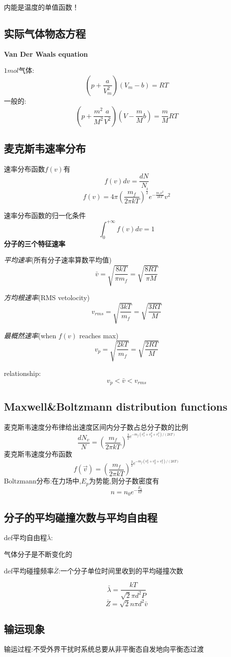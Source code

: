 \documentclass[10pt,a4paper]{article}
\begin{document}
内能是温度的单值函数！
\subsection{实际气体物态方程}
\textbf{Van Der Waals equation}

$1mol$气体:
\[(p+\frac{a}{V_m^2})(V_m-b)=RT\]
一般的:
\[(p+\frac{m^2}{M^2}\frac{a}{V^2})(V-\frac{m}{M}b)=\frac{m}{M}RT\]
\subsection{麦克斯韦速率分布}
速率分布函数$f(v)$有
\[\boxed{f(v)dv=\frac{dN}{N}}\]
\[f(v)=4\pi\left(\frac{m_f}{2\pi kT}\right)^{\frac{3}{2}}e^{-\frac{m_fv^2}{2kT}}v^2\]

速率分布函数的归一化条件
\[\int_0^{+\infty}f(v)dv=1\]
\textbf{分子的三个特征速率}

\textit{平均速率}(所有分子速率算数平均值)
\[\bar{v}=\sqrt{\frac{8kT}{\pi m_f}}=\sqrt{\frac{8RT}{\pi M}}\]

\textit{方均根速率}(RMS vetolocity)
\[v_{rms}=\sqrt{\frac{3kT}{m_f}}=\sqrt{\frac{3RT}{M}}\]

\textit{最概然速率}(when $f(v)$ reaches max)
\[v_{p}=\sqrt{\frac{2kT}{m_f}}=\sqrt{\frac{2RT}{M}}\]

relationship:
\[v_p<\bar{v}<v_{rms}\]
\subsection{Maxwell\&Boltzmann distribution functions}
麦克斯韦速度分布律给出速度区间内分子数占总分子数的比例
\[\frac{dN_v}{N}=\left(\frac{m_f}{2\pi kT}\right)^{\frac{3}{2}e^{-m_f(v_x^2+v_y^2+v_z^2)/(2kT)}} \]
麦克斯韦速度分布函数
\[f(\vec{v})=\left(\frac{m_f}{2\pi kT}\right)^{\frac{3}{2}e^{-m_f(v_x^2+v_y^2+v_z^2)/(2kT)}}\]
Boltzmann分布:在力场中,$E_p$为势能,则分子数密度有
\[\boxed{n=n_0e^{-\frac{E_p}{kT}}}\]
\subsection{分子的平均碰撞次数与平均自由程}
def平均自由程$\bar{\lambda}$:

气体分子是不断变化的

def平均碰撞频率$\bar{Z}$:一个分子单位时间里收到的平均碰撞次数

\[\bar{\lambda}=\frac{kT}{\sqrt{2}\pi d^2P}\]
\[\bar{Z}=\sqrt{2}n\pi d^2\bar{v}\]
\subsection{输运现象}
输运过程:不受外界干扰时系统总要从非平衡态自发地向平衡态过渡
\end{document}
